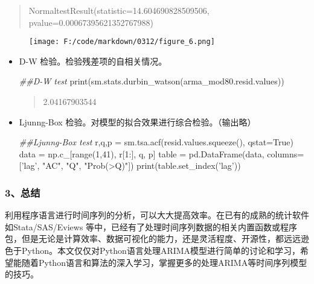 \documentclass[]{article}
\newenvironment{Shaded}{}{}
\newcommand{\DecValTok}[1]{\textcolor[rgb]{0.25,0.63,0.44}{#1}}
\newcommand{\StringTok}[1]{\textcolor[rgb]{0.25,0.44,0.63}{#1}}
\newcommand{\CommentTok}[1]{\textcolor[rgb]{0.38,0.63,0.69}{\textit{#1}}}
\newcommand{\VariableTok}[1]{\textcolor[rgb]{0.10,0.09,0.49}{#1}}
\newcommand{\OperatorTok}[1]{\textcolor[rgb]{0.40,0.40,0.40}{#1}}
\newcommand{\BuiltInTok}[1]{#1}
\newcommand{\NormalTok}[1]{#1}
\begin{document}
\begin{quote}
NormaltestResult(statistic=14.604690828509506,
pvalue=0.00067395621352767988)
\end{quote}

\begin{figure}
\centering
\texttt{[image: F:/code/markdown/0312/figure\_6.png]}
\caption{}
\end{figure}

\begin{itemize}
\item
  D-W 检验。检验残差项的自相关情况。

\begin{Shaded}
\begin{Highlighting}[]
\CommentTok{##D-W test}
\BuiltInTok{print}\NormalTok{(sm.stats.durbin_watson(arma_mod80.resid.values))}
\end{Highlighting}
\end{Shaded}

  \begin{quote}
  2.04167903544
  \end{quote}
\item
  Ljunng-Box 检验。对模型的拟合效果进行综合检验。（输出略）

\begin{Shaded}
\begin{Highlighting}[]
\CommentTok{##Ljunng-Box test}
\NormalTok{r,q,p }\OperatorTok{=}\NormalTok{ sm.tsa.acf(resid.values.squeeze(), qstat}\OperatorTok{=}\VariableTok{True}\NormalTok{)}
\NormalTok{data }\OperatorTok{=}\NormalTok{ np.c_[}\BuiltInTok{range}\NormalTok{(}\DecValTok{1}\NormalTok{,}\DecValTok{41}\NormalTok{), r[}\DecValTok{1}\NormalTok{:], q, p]}
\NormalTok{table }\OperatorTok{=}\NormalTok{ pd.DataFrame(data, columns}\OperatorTok{=}\NormalTok{[}\StringTok{'lag'}\NormalTok{, }\StringTok{"AC"}\NormalTok{, }\StringTok{"Q"}\NormalTok{, }\StringTok{"Prob(>Q)"}\NormalTok{])}
\BuiltInTok{print}\NormalTok{(table.set_index(}\StringTok{'lag'}\NormalTok{))}
\end{Highlighting}
\end{Shaded}
\end{itemize}

\subsubsection{3、总结}\label{header-c13}

利用程序语言进行时间序列的分析，可以大大提高效率。在已有的成熟的统计软件如Stata/SAS/Eviews
等中，已经有了处理时间序列数据的相关内置函数或程序包，但是无论是计算效率、数据可视化的能力，还是灵活程度、开源性，都远远逊色于Python。本文仅仅对Python语言处理ARIMA模型进行简单的讨论和学习，希望能随着Python语言和算法的深入学习，掌握更多的处理ARIMA等时间序列模型的技巧。
\end{document}
